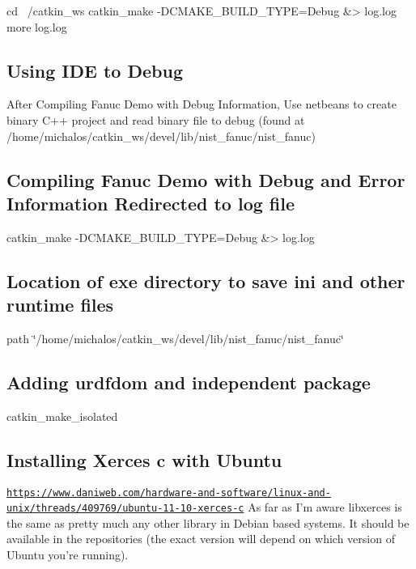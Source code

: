 \begin{DoxyVerb}cd ~/catkin_ws
catkin_make -DCMAKE_BUILD_TYPE=Debug &> log.log
more log.log
\end{DoxyVerb}


\subsection*{Using I\-D\-E to Debug }

After Compiling Fanuc Demo with Debug Information, Use netbeans to create binary C++ project and read binary file to debug (found at /home/michalos/catkin\-\_\-ws/devel/lib/nist\-\_\-fanuc/nist\-\_\-fanuc)

\subsection*{Compiling Fanuc Demo with Debug and Error Information Redirected to log file }

\begin{DoxyVerb}catkin_make -DCMAKE_BUILD_TYPE=Debug &> log.log
\end{DoxyVerb}


\subsection*{Location of exe directory to save ini and other runtime files }

path \char`\"{}/home/michalos/catkin\-\_\-ws/devel/lib/nist\-\_\-fanuc/nist\-\_\-fanuc\char`\"{}

\subsection*{Adding urdfdom and independent package }

catkin\-\_\-make\-\_\-isolated

\subsection*{Installing Xerces c with Ubuntu }

\href{https://www.daniweb.com/hardware-and-software/linux-and-unix/threads/409769/ubuntu-11-10-xerces-c}{\tt https\-://www.\-daniweb.\-com/hardware-\/and-\/software/linux-\/and-\/unix/threads/409769/ubuntu-\/11-\/10-\/xerces-\/c} As far as I'm aware libxerces is the same as pretty much any other library in Debian based systems. It should be available in the repositories (the exact version will depend on which version of Ubuntu you're running).

